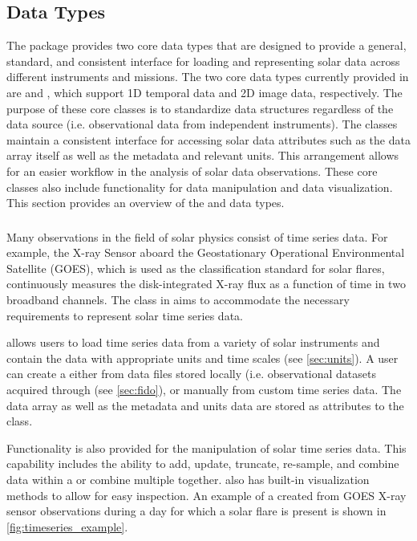 \subsection{Data Types}
\label{sec:data_types}

The \sunpypkg package provides two core data types that are designed to provide a general, standard, and consistent interface for loading and representing solar data across different instruments and missions.
The two core data types currently provided in \sunpypkg are \Timeseries and \Map, which support 1D temporal data and 2D image data, respectively.
The purpose of these core classes is to standardize data structures regardless of the data source (i.e. observational data from independent instruments).
The classes maintain a consistent interface for accessing solar data attributes such as the data array itself as well as the metadata and relevant units.
This arrangement allows for an easier workflow in the analysis of solar data observations.
These core classes also include functionality for data manipulation and data visualization.
This section provides an overview of the \Timeseries and \Map data types.

\subsubsection{\Timeseries}
\label{sec:timeseries}
Many observations in the field of solar physics consist of time series data.
For example, the X-ray Sensor aboard the Geostationary Operational Environmental Satellite (GOES), which is used as the classification standard for solar flares, continuously measures the disk-integrated X-ray flux as a function of time in two broadband channels.
The \Timeseries class in \sunpypkg aims to accommodate the necessary requirements to represent solar time series data.

\Timeseries allows users to load time series data from a variety of solar instruments and contain the data with appropriate units and time scales (see \autoref{sec:units}).
 A user can create a \Timeseries either from data files stored locally (i.e. observational datasets acquired through \Fido (see \autoref{sec:fido}), or manually from custom time series data.
 The data array as well as the metadata and units data are stored as attributes to the \Timeseries class.

Functionality is also provided for the manipulation of solar time series data.
This capability includes the ability to add, update, truncate, re-sample, and combine data within a \Timeseries or combine multiple \Timeseries together.
\Timeseries also has built-in visualization methods to allow for easy inspection.
An example of a \Timeseries created from GOES X-ray sensor observations during a day for which a solar flare is present is shown in \autoref{fig:timeseries_example}.

